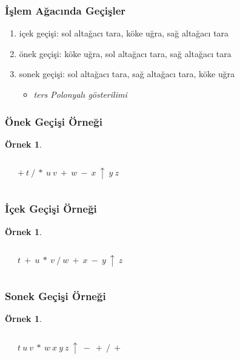 \documentclass[dvipsnames]{beamer}
\theoremstyle{definition}
\theoremstyle{example}
\newtheorem{ornek}[theorem]{Örnek}
\theoremstyle{plain}
\begin{document}
\begin{frame}
  \frametitle{İşlem Ağacında Geçişler}

  \begin{enumerate}
    \item \alert{içek geçişi}: sol altağacı tara, köke uğra, sağ altağacı tara

    \pause
    \medskip
    \item \alert{önek geçişi}: köke uğra, sol altağacı tara, sağ altağacı tara

    \pause
    \medskip
    \item \alert{sonek geçişi}: sol altağacı tara, sağ altağacı tara, köke uğra
    \begin{itemize}
      \item \emph{ters Polonyalı gösterilimi}
    \end{itemize}
  \end{enumerate}
\end{frame}

\begin{frame}
  \frametitle{Önek Geçişi Örneği}

  \begin{ornek}
    \begin{columns}
      \begin{center}
      \end{center}

      \pause
      $+ ~ t ~ / ~ * ~ u ~ v ~ + ~ w ~ - ~ x ~ \uparrow ~ y ~ z$
    \end{columns}
  \end{ornek}
\end{frame}

\begin{frame}
  \frametitle{İçek Geçişi Örneği}

  \begin{ornek}
    \begin{columns}
      \begin{center}
      \end{center}

      \pause
      $t ~ + ~ u ~ * ~ v ~ / ~ w ~ + ~ x ~ - ~ y ~ \uparrow ~ z$
    \end{columns}
  \end{ornek}
\end{frame}

\begin{frame}
  \frametitle{Sonek Geçişi Örneği}

  \begin{ornek}
    \begin{columns}
      \begin{center}
      \end{center}

      \pause
      $t ~ u ~ v ~ * ~ w ~ x ~ y ~ z ~ \uparrow ~ - ~ + ~ / ~ +$
    \end{columns}
  \end{ornek}
\end{frame}
\end{document}
